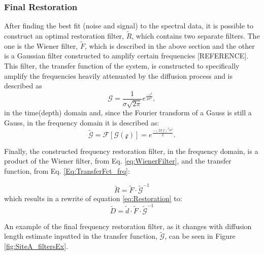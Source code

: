 \documentclass[../../CompleteThesis2/Complete_2ndDraft]{subfiles}
\begin{document}
\subsubsection[Final Restoration][Final Restoration]{Final Restoration}
\label{Subsubsec:SignalAnalysis_BackDiffusion_FinalRestoration}

After finding the best fit (noise and signal) to the spectral data, it is possible to construct an optimal restoration filter, $\tilde{R}$, which contains two separate filters. The one is the Wiener filter, $\tilde{F}$, which is described in the above section and the other is a Gaussian filter constructed to amplify certain frequencies [REFERENCE]. This filter, the transfer function of the system, is constructed to specifically amplify the frequencies heavily attenuated by the diffusion process and is described as
\begin{equation}
	\mathcal{G} = \frac{1}{\sigma\sqrt{2\pi}} e^{\frac{-z^2}{2\sigma^2}},
	\label{Eq:TransferFct_z}
\end{equation}
in the time(depth) domain and, since the Fourier transform of a Gauss is still a Gauss, in the frequency domain it is described as:
\begin{equation}
	\tilde{\mathcal{G}} = \mathcal{F}[\mathcal{G(z)}] = e^{\frac{-(2\pi\, f)^2\sigma^2}{2}}.
	\label{Eq:TransferFct_frq}
\end{equation}

Finally, the constructed frequency restoration filter, in the frequency domain, is a product of the Wiener filter, from Eq. \ref{eq:WienerFilter}, and the transfer function, from Eq. \ref{Eq:TransferFct_frq}:

\begin{equation}
	\tilde{R} =  \tilde{F} \cdot \tilde{\mathcal{G}}^{-1}
\end{equation}
which results in a rewrite of equation \ref{eq:Restoration} to:
\begin{equation}
	\tilde{D} = \tilde{d}\cdot\tilde{F}\cdot\tilde{\mathcal{G}}^{-1}
\end{equation}

An example of the final frequency restoration filter, as it changes with diffusion length estimate inputted in the transfer function, $\tilde{\mathcal{G}}$, can be seen in Figure \ref{fig:SiteA_filtersEx}.
\end{document}
